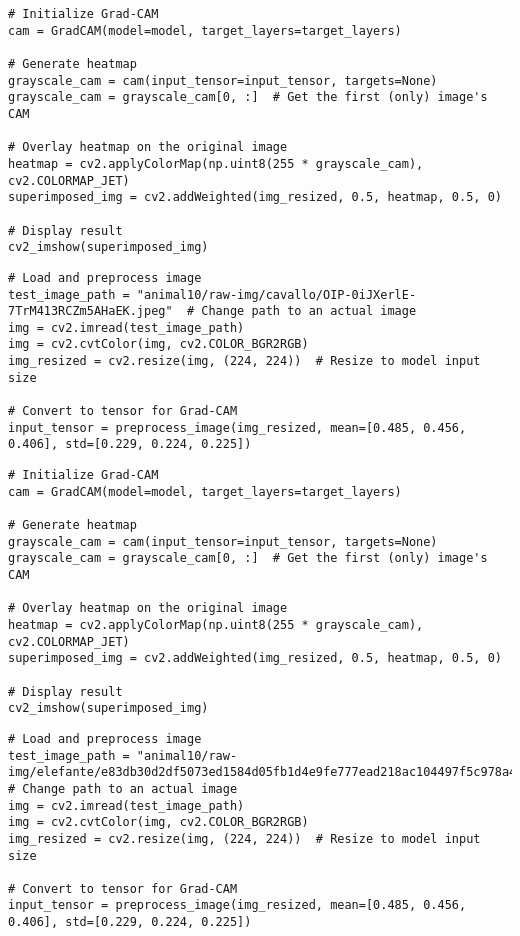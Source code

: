 \documentclass{article}
\begin{document}
\begin{verbatim}
# Initialize Grad-CAM
cam = GradCAM(model=model, target_layers=target_layers)

# Generate heatmap
grayscale_cam = cam(input_tensor=input_tensor, targets=None)
grayscale_cam = grayscale_cam[0, :]  # Get the first (only) image's CAM

# Overlay heatmap on the original image
heatmap = cv2.applyColorMap(np.uint8(255 * grayscale_cam), cv2.COLORMAP_JET)
superimposed_img = cv2.addWeighted(img_resized, 0.5, heatmap, 0.5, 0)

# Display result
cv2_imshow(superimposed_img)
\end{verbatim}

\begin{verbatim}
# Load and preprocess image
test_image_path = "animal10/raw-img/cavallo/OIP-0iJXerlE-7TrM413RCZm5AHaEK.jpeg"  # Change path to an actual image
img = cv2.imread(test_image_path)
img = cv2.cvtColor(img, cv2.COLOR_BGR2RGB)
img_resized = cv2.resize(img, (224, 224))  # Resize to model input size

# Convert to tensor for Grad-CAM
input_tensor = preprocess_image(img_resized, mean=[0.485, 0.456, 0.406], std=[0.229, 0.224, 0.225])
\end{verbatim}

\begin{verbatim}
# Initialize Grad-CAM
cam = GradCAM(model=model, target_layers=target_layers)

# Generate heatmap
grayscale_cam = cam(input_tensor=input_tensor, targets=None)
grayscale_cam = grayscale_cam[0, :]  # Get the first (only) image's CAM

# Overlay heatmap on the original image
heatmap = cv2.applyColorMap(np.uint8(255 * grayscale_cam), cv2.COLORMAP_JET)
superimposed_img = cv2.addWeighted(img_resized, 0.5, heatmap, 0.5, 0)

# Display result
cv2_imshow(superimposed_img)
\end{verbatim}

\begin{verbatim}
# Load and preprocess image
test_image_path = "animal10/raw-img/elefante/e83db30d2df5073ed1584d05fb1d4e9fe777ead218ac104497f5c978a4efbcb0_640.jpg"  # Change path to an actual image
img = cv2.imread(test_image_path)
img = cv2.cvtColor(img, cv2.COLOR_BGR2RGB)
img_resized = cv2.resize(img, (224, 224))  # Resize to model input size

# Convert to tensor for Grad-CAM
input_tensor = preprocess_image(img_resized, mean=[0.485, 0.456, 0.406], std=[0.229, 0.224, 0.225])
\end{verbatim}
\end{document}

